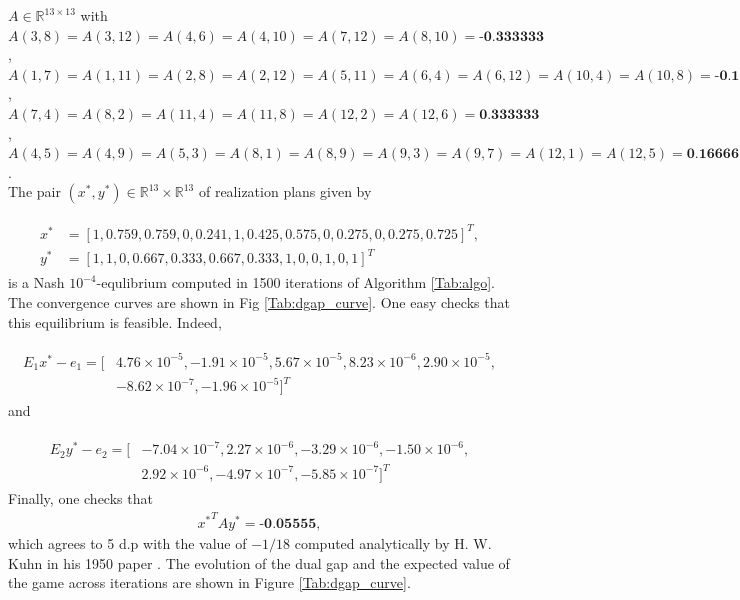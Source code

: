 \documentclass{article} %
\begin{document}
 $A \in \mathbb{R}^{13 \times
  13}$ with $A(3,8) = A(3,12) = A(4,6) = A(4,10) = A(7,12) = A(8,10) =
\textbf{-0.333333}$, $A(1,7) = A(1,11) = A(2,8) = A(2,12) = A(5,11) =
A(6,4) = A(6,12) = A(10,4) = A(10,8) = \textbf{-0.166667}$, $A(7,4) =
A(8,2) = A(11,4) = A(11,8) = A(12,2) = A(12,6) = \textbf{0.333333}$,
$A(4,5) = A(4,9) = A(5,3) = A(8,1) = A(8,9) = A(9,3) = A(9,7) =
A(12,1) = A(12,5) = \textbf{0.166667}$.\\

The pair $(x^*, y^*) \in \mathbb{R}^{13} \times \mathbb{R}^{13}$ of
realization plans given by

\begin{eqnarray*}
  \begin{split}
    x^* &= [1, 0.759, 0.759, 0, 0.241, 1, 0.425, 0.575, 0, 0.275, 0,
      0.275, 0.725]^T,\\
    y^* &= [1, 1, 0, 0.667, 0.333, 0.667, 0.333, 1, 0, 0, 1, 0, 1]^T
    \end{split}
\end{eqnarray*}
is a Nash $10^{-4}$-equlibrium computed in 1500 iterations of
Algorithm  \ref{Tab:algo}. The convergence curves are shown
in Fig \ref{Tab:dgap_curve}. One easy checks that this equilibrium is
feasible. Indeed,

\begin{eqnarray*}
  \begin{split}
    E_1x^* - e_1 = [&4.76 \times 10^{-5}, -1.91 \times 10^{-5}, 5.67
      \times 10^{-5}, 8.23 \times 10^{-6}, 2.90 \times 10^{-5}, \\&
      -8.62 \times 10^{-7}, -1.96 \times 10^{-5}]^T
    \end{split}
\end{eqnarray*}
and

\begin{eqnarray*}
  \begin{split}
    E_2y^* - e_2 = [&-7.04 \times 10^{-7}, 2.27 \times 10^{-6}, -3.29
      \times 10^{-6}, -1.50 \times 10^{-6},\\
      &2.92 \times 10^{-6}, -4.97 \times 10^{-7}, -5.85 \times
      10^{-7}]^T
    \end{split}
\end{eqnarray*}
Finally, one checks that
\begin{eqnarray*}
  {x^*}^TAy^* = \textbf{-0.05555},
\end{eqnarray*}
 which agrees to 5 d.p with the value of $-1 / 18$ computed
 analytically by H. W. Kuhn in his 1950 paper \cite{kuhn}. The
 evolution of the dual gap and the expected value of the game across
 iterations are shown in Figure \ref{Tab:dgap_curve}.
\end{document}
